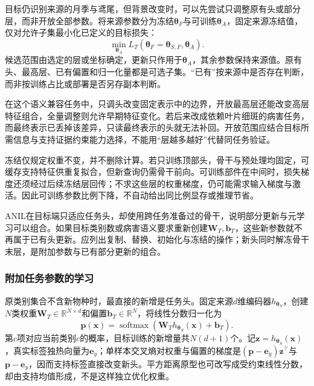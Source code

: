 目标仍识别来源的月季与鸢尾，但背景改变时，可以先尝试只调整原有头或部分层，而非开放全部参数。将来源参数分为冻结$\bm\theta_F$与可训练$\bm\theta_A$，固定来源冻结值，仅对允许子集最小化已定义的目标损失：
\[
  \min_{\bm{\theta}_A}
  L_T(\bm{\theta}_F=\bm{\theta}_{S,F},\bm{\theta}_A).
\]
候选范围由选定的层或坐标确定，更新只作用于$\bm\theta_A$，其余参数保持来源值。原有头、最高层、已有偏置和归一化量都是可选子集。“已有”按来源中是否存在判断，而非按训练占比或部署是否另存副本判断。

在这个语义兼容任务中，只调头改变固定表示中的边界，开放最高层还能改变高层特征组合，全量调整则允许早期特征变化。若后来改成依赖叶片细斑的病害任务，而最终表示已丢掉该差异，只读最终表示的头就无法补回。开放范围应结合目标所需信息与支持证据约束能力选择，不能用“层越多越好”代替同任务验证。

冻结仅规定权重不变，并不删除计算。若只训练顶部头，骨干与预处理均固定，可缓存支持特征供重复拟合，但新查询仍需骨干前向。可训练部件在中间时，损失梯度还须经过后续冻结层回传；不求这些层的权重梯度，仍可能需求输入梯度与激活。因此可训练参数比例下降，不自动给出同比例显存或推理节省。

ANIL在目标端只适应任务头，却使用跨任务准备过的骨干，说明部分更新与元学习可以组合。如果目标类别数或病害语义要求重新创建$\bm W_T,\bm b_T$，这些新参数就不再属于已有头更新。应列出复制、替换、初始化与冻结的操作；新头同时解冻骨干末层，是附加参数与已有部分更新的组合。

\subsubsection{附加任务参数的学习}
\label{sec:ket-transfer-added-parameters}

原类别集合不含新物种时，最直接的新增是任务头。固定来源$d$维编码器$h_{\bm\theta_S}$，创建$N$类权重$\bm W_T\in\mathbb R^{N\times d}$和偏置$\bm b_T\in\mathbb R^N$，将线性分数归一化为
\begin{equation}
  \bm p(\bm x)
   =\operatorname{softmax}(\bm W_T h_{\bm{\theta}_S}(\bm x)+\bm b_T).
  \label{eq:ket-transfer-new-head}
\end{equation}
第$c$项对应当前类别$c$的概率，目标训练的新增量共$N(d+1)$个。记$\bm z=h_{\bm\theta_S}(\bm x)$，真实标签独热向量为$\bm e_y$；单样本交叉熵对权重与偏置的梯度是$(\bm p-\bm e_y)\bm z^\top$与$\bm p-\bm e_y$，因而支持标签直接改变新头。平方距离原型也可改写成受约束线性分数，却由支持均值形成，不是这样独立优化权重。

